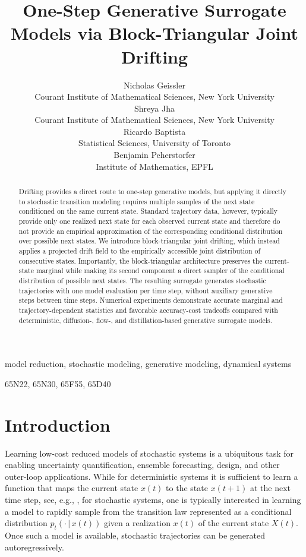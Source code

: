 \documentclass[oneside,11pt]{article}
\title{One-Step Generative Surrogate Models via Block-Triangular Joint Drifting}
\author{%
  Nicholas Geissler\\
   \addr Courant Institute of Mathematical Sciences, New York University\\
   \AND
 \name Shreya Jha \\
  \addr Courant Institute of Mathematical Sciences, New York University\\
  \AND
 \name Ricardo Baptista \\
  \addr Statistical Sciences, University of Toronto\\
   \AND
  Benjamin Peherstorfer\\
   \addr Institute of Mathematics, EPFL
}
\theoremstyle{remark}
\begin{document}
\maketitle

\begin{abstract}
Drifting provides a direct route to one-step generative models, but applying it directly to stochastic transition modeling requires multiple samples of the next state conditioned on the same current state. Standard trajectory data, however, typically provide only one realized next state for each observed current state and therefore do not provide an empirical approximation of the corresponding conditional distribution over possible next states. We introduce block-triangular joint drifting, which instead applies a projected drift field to the empirically accessible joint distribution of consecutive states. Importantly, the block-triangular architecture preserves the current-state marginal while making its second component a direct sampler of the conditional distribution of possible next states. The resulting surrogate generates stochastic trajectories with one model evaluation per time step, without auxiliary generative steps between time steps. Numerical experiments demonstrate accurate marginal and trajectory-dependent statistics and favorable accuracy-cost tradeoffs compared with deterministic, diffusion-, flow-, and distillation-based generative surrogate models.
\end{abstract}

\begin{keywords}
  model reduction, stochastic modeling, generative modeling, dynamical systems
\end{keywords}

\begin{AMS}
  65N22, 65N30, 65F55, 65D40
\end{AMS}


\section{Introduction}

Learning low-cost reduced models of stochastic systems is a ubiquitous task for enabling uncertainty quantification, ensemble forecasting, design, and other outer-loop applications. 
While for deterministic systems it is sufficient to learn a function that maps the current state $x(t)$ to the state $x(t + 1)$ at the next time step, see, e.g., \cite{PEHERSTORFER2016196,Fresca2021,Lu2021,JMLR:v24:21-1524,Regazzoni2024,BATLLE2024112549}, for stochastic systems, one is typically interested in learning a model to rapidly sample from the transition law represented as a conditional distribution $p_t(\cdot \,|\, x(t))$ given a realization $x(t)$ of the current state $X(t)$. Once such a model is available, stochastic trajectories can be generated autoregressively. 
\end{document}
